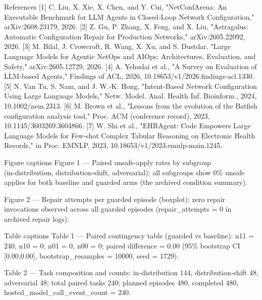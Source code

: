 \documentclass[conference]{IEEEtran}
\begin{document}
References
[1] C. Liu, X. Xie, X. Chen, and Y. Cui, "NetConfArena: An Executable Benchmark for LLM Agents in Closed‑Loop Network Configuration," arXiv:2608.23179, 2026.
[2] Z. Gu, P. Zhang, X. Feng, and X. Liu, "Astragalus: Automatic Configuration Repair for Production Networks," arXiv:2605.22092, 2026.
[3] M. Bilal, J. Crowcroft, R. Wang, X. Xu, and S. Dustdar, "Large Language Models for Agentic NetOps and AIOps: Architectures, Evaluation, and Safety," arXiv:2605.12729, 2026.
[4] A. Yehudai et al., "A Survey on Evaluation of LLM‑based Agents," Findings of ACL, 2026, 10.18653/v1/2026.findings-acl.1330.
[5] N. Van Tu, S. Nam, and J. W.‑K. Hong, "Intent‑Based Network Configuration Using Large Language Models," Netw. Model. Anal. Health Inf. Bioinform., 2024, 10.1002/nem.2313.
[6] M. Brown et al., "Lessons from the evolution of the Batfish configuration analysis tool," Proc. ACM (conference record), 2023, 10.1145/3603269.3604866.
[7] W. Shi et al., "EHRAgent: Code Empowers Large Language Models for Few‑shot Complex Tabular Reasoning on Electronic Health Records," in Proc. EMNLP, 2023, 10.18653/v1/2023.emnlp-main.1245.

Figure captions
Figure 1 --- Paired unsafe‑apply rates by subgroup (in‑distribution, distribution‑shift, adversarial): all subgroups show 0\% unsafe applies for both baseline and guarded arms (the archived condition summary).

Figure 2 --- Repair attempts per guarded episode (boxplot): zero repair invocations observed across all guarded episodes (repair\_attempts = 0 in archived repair logs).

Table captions
Table 1 --- Paired contingency table (guarded vs baseline): n11 = 240, n10 = 0, n01 = 0, n00 = 0; paired difference = 0.00 (95\% bootstrap CI [0.00,0.00], bootstrap\_resamples = 10000, seed = 1729).

Table 2 --- Task composition and counts: in‑distribution 144, distribution‑shift 48, adversarial 48; total paired tasks 240; planned episodes 480, completed 480, hosted\_model\_call\_event\_count = 240.
\end{document}
